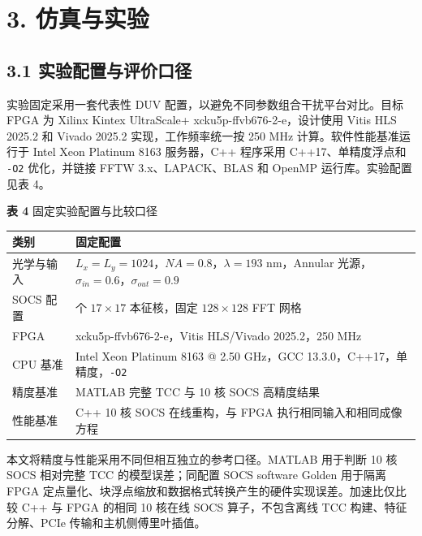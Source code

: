 \documentclass[
  preprint]{elsarticle}
\newcounter{none} %
\begin{document}
\section{3. 仿真与实验}\label{ux4effux771fux4e0eux5b9eux9a8c}

\subsection{3.1
实验配置与评价口径}\label{ux5b9eux9a8cux914dux7f6eux4e0eux8bc4ux4ef7ux53e3ux5f84}

实验固定采用一套代表性 DUV 配置，以避免不同参数组合干扰平台对比。目标
FPGA 为 Xilinx Kintex UltraScale+ xcku5p-ffvb676-2-e，设计使用 Vitis HLS
2025.2 和 Vivado 2025.2 实现，工作频率统一按 250 MHz
计算。软件性能基准运行于 Intel Xeon Platinum 8163 服务器，C++ 程序采用
C++17、单精度浮点和 \texttt{-O2} 优化，并链接 FFTW 3.x、LAPACK、BLAS 和
OpenMP 运行库。实验配置见表 4。

\textbf{表 4} 固定实验配置与比较口径

{\def\LTcaptype{none} %
\begin{longtable}[]{@{}
  >{\raggedright\arraybackslash}p{}
  >{\raggedright\arraybackslash}p{}@{}}
\toprule\noalign{}
\begin{minipage}[b]{\linewidth}\raggedright
类别
\end{minipage} & \begin{minipage}[b]{\linewidth}\raggedright
固定配置
\end{minipage} \\
\midrule\noalign{}
\endhead
\bottomrule\noalign{}
\endlastfoot
光学与输入 & \(L_x=L_y=1024\)，\(NA=0.8\)，\(\lambda=193\) nm，Annular
光源，\(\sigma_{in}=0.6\)，\(\sigma_{out}=0.9\) \\
SOCS 配置 & 10 个 \(17\times17\) 本征核，固定 \(128\times128\) FFT
网格 \\
FPGA & xcku5p-ffvb676-2-e，Vitis HLS/Vivado 2025.2，250 MHz \\
CPU 基准 & Intel Xeon Platinum 8163 @ 2.50 GHz，GCC
13.3.0，C++17，单精度，\texttt{-O2} \\
精度基准 & MATLAB 完整 TCC 与 10 核 SOCS 高精度结果 \\
性能基准 & C++ 10 核 SOCS 在线重构，与 FPGA
执行相同输入和相同成像方程 \\
\end{longtable}
}

本文将精度与性能采用不同但相互独立的参考口径。MATLAB 用于判断 10 核 SOCS
相对完整 TCC 的模型误差；同配置 SOCS software Golden 用于隔离 FPGA
定点量化、块浮点缩放和数据格式转换产生的硬件实现误差。加速比仅比较 C++
与 FPGA 的相同 10 核在线 SOCS 算子，不包含离线 TCC 构建、特征分解、PCIe
传输和主机侧傅里叶插值。
\end{document}
